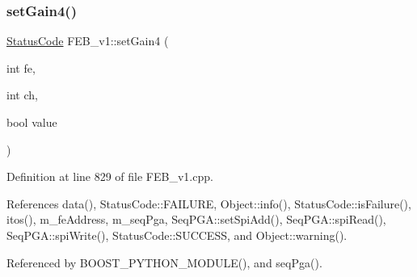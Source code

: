 \subsubsection{\texorpdfstring{set\+Gain4()}{setGain4()}}
{\footnotesize\ttfamily \hyperlink{classStatusCode}{Status\+Code} F\+E\+B\+\_\+v1\+::set\+Gain4 (\begin{DoxyParamCaption}\item[{int}]{fe,  }\item[{int}]{ch,  }\item[{bool}]{value }\end{DoxyParamCaption})}



Definition at line 829 of file F\+E\+B\+\_\+v1.\+cpp.



References data(), Status\+Code\+::\+F\+A\+I\+L\+U\+RE, Object\+::info(), Status\+Code\+::is\+Failure(), itos(), m\+\_\+fe\+Address, m\+\_\+seq\+Pga, Seq\+P\+G\+A\+::set\+Spi\+Add(), Seq\+P\+G\+A\+::spi\+Read(), Seq\+P\+G\+A\+::spi\+Write(), Status\+Code\+::\+S\+U\+C\+C\+E\+SS, and Object\+::warning().



Referenced by B\+O\+O\+S\+T\+\_\+\+P\+Y\+T\+H\+O\+N\+\_\+\+M\+O\+D\+U\+L\+E(), and seq\+Pga().


